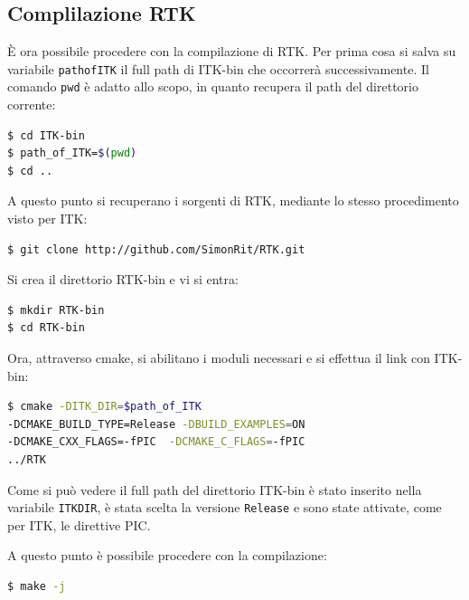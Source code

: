\documentclass[a4paper,12pt, doubleside]{report}
\begin{document}
            \subsection{Complilazione RTK}
                \par
                    È ora possibile procedere con la compilazione di RTK.
                    Per prima cosa si salva su variabile \texttt{path\textunderscore of\textunderscore ITK} il full path di ITK-bin che occorrerà successivamente. Il comando \texttt{pwd} è adatto allo scopo, in quanto recupera il path del direttorio corrente:
                    \begin{lstlisting}[language=bash, frame=bt]
$ cd ITK-bin
$ path_of_ITK=$(pwd)
$ cd ..
                    \end{lstlisting}
                    
                    A questo punto si recuperano i sorgenti di RTK, mediante lo stesso procedimento visto per ITK:
                    
                    \begin{lstlisting}[language=bash, frame=bt]
$ git clone http://github.com/SimonRit/RTK.git
                    \end{lstlisting}
                    
                    \bigskip
                    Si crea il direttorio RTK-bin e vi si entra:
                    \begin{lstlisting}[language=bash, frame=bt]
$ mkdir RTK-bin
$ cd RTK-bin
                    \end{lstlisting}
                    
                    Ora, attraverso cmake, si abilitano i moduli necessari e si effettua il link con ITK-bin:
                    \begin{lstlisting}[language=bash, frame=bt]
$ cmake -DITK_DIR=$path_of_ITK 
-DCMAKE_BUILD_TYPE=Release -DBUILD_EXAMPLES=ON 
-DCMAKE_CXX_FLAGS=-fPIC  -DCMAKE_C_FLAGS=-fPIC 
../RTK
                    \end{lstlisting}
                   
                    Come si può vedere il full path del direttorio ITK-bin è stato inserito nella variabile \texttt{ITK\textunderscore DIR}, è stata scelta la versione \texttt{Release} e sono state attivate, come per ITK, le direttive PIC.
    
                    A questo punto è possibile procedere con la compilazione:
                    \begin{lstlisting}[language=bash, frame=bt]
$ make -j
                    \end{lstlisting}
                   
\end{document}
